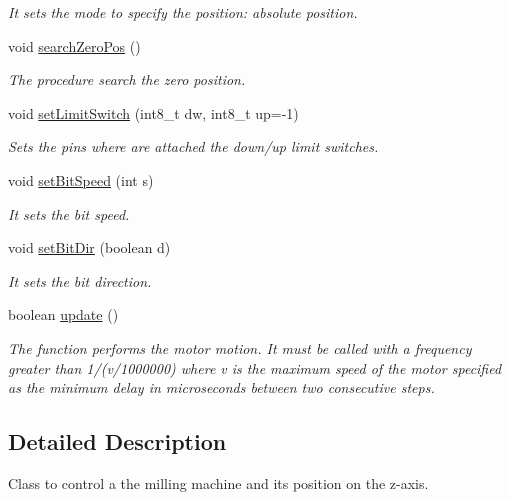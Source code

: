 \begin{DoxyCompactItemize}
\begin{DoxyCompactList}\small\item\em It sets the mode to specify the position\+: absolute position. \end{DoxyCompactList}\item 
void \hyperlink{class_milling_machine_a4c8204cae4818204035e210080a2705d}{search\+Zero\+Pos} ()
\begin{DoxyCompactList}\small\item\em The procedure search the zero position. \end{DoxyCompactList}\item 
void \hyperlink{class_milling_machine_abea98221e7a7fe1a9366e5f8d200f268}{set\+Limit\+Switch} (int8\+\_\+t dw, int8\+\_\+t up=-\/1)
\begin{DoxyCompactList}\small\item\em Sets the pins where are attached the down/up limit switches. \end{DoxyCompactList}\item 
void \hyperlink{class_milling_machine_a9d059e6adb7edd4ee42a0d6fce0338c3}{set\+Bit\+Speed} (int s)
\begin{DoxyCompactList}\small\item\em It sets the bit speed. \end{DoxyCompactList}\item 
void \hyperlink{class_milling_machine_aa9e80231444db8c4bfaef2829a12230f}{set\+Bit\+Dir} (boolean d)
\begin{DoxyCompactList}\small\item\em It sets the bit direction. \end{DoxyCompactList}\item 
boolean \hyperlink{class_milling_machine_ac74c527eb504eb6f13d80fb64487c874}{update} ()
\begin{DoxyCompactList}\small\item\em The function performs the motor motion. It must be called with a frequency greater than 1/(v/1000000) where v is the maximum speed of the motor specified as the minimum delay in microseconds between two consecutive steps. \end{DoxyCompactList}\end{DoxyCompactItemize}


\subsection{Detailed Description}
Class to control a the milling machine and its position on the z-\/axis. 

